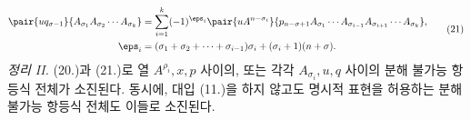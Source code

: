 
\begin{equation}
\begin{aligned}
\pair{u q_{\sigma-1}}{A_{\sigma_1}A_{\sigma_2}\cdots A_{\sigma_k}}
&=\sum_{i=1}^{k}(-1)^{\eps_i}\pair{u A^{n-\sigma_i}}{p_{n-\sigma+1}A_{\sigma_1}\cdots A_{\sigma_{i-1}}A_{\sigma_{i+1}}\cdots A_{\sigma_k}},\\
\eps_i&=(\sigma_1+\sigma_2+\cdots+\sigma_{i-1})\sigma_i+(\sigma_i+1)(n+\sigma).
\end{aligned}
\tag{21}
\end{equation}
\emph{정리 II.} (20.)과 (21.)로 열 $A^{\rho_i},x,p$ 사이의, 또는 각각 $A_{\sigma_i},u,q$ 사이의 분해 불가능 항등식 전체가 소진된다. 동시에, 대입 (11.)을 하지 않고도 명시적 표현을 허용하는 분해 불가능 항등식 전체도 이들로 소진된다.
